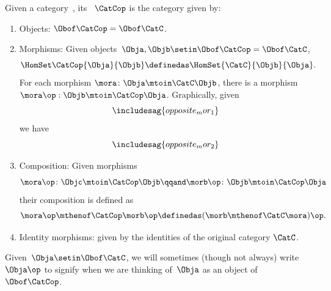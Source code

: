 \begin{ctdefinition}
    \label{def:opposite-category}
    \label{def:oppositecat}
    Given a category~\CatC, its ~$\CatCop$ is the category given by:

    \constit

    \begin{enumerate}
        \item Objects: $\Obof\CatCop = \Obof\CatC$.

        \item Morphisms: Given objects~$\Obja,  \Objb \setin \Obof\CatCop = \Obof\CatC$,
              \begin{equation}\label{eq:homset-op-cat}
                  \HomSet\CatCop{\Obja}{\Objb} \definedas \HomSet{\CatC}{\Objb}{\Obja}.
              \end{equation}
              For each morphism $\mora\colon\Obja\mtoin\CatC\Objb$, there is a morphism
              $\mora\op:\Objb\mtoin\CatCop\Obja$.
              Graphically, given
              \begin{equation}\label{eq:opposite_mor_1}
                  \includesag{opposite_mor_1}
              \end{equation}
              we have
              \begin{equation}
                  \label{eq:opposite_mor_2}
                  \includesag{opposite_mor_2}
              \end{equation}
        \item Composition: Given morphisms
              \begin{equation}
                  \mora\op\colon \Objc \mtoin\CatCop \Objb
                  \qqand
                  \morb\op\colon \Objb \mtoin\CatCop \Obja
              \end{equation}
              their composition is defined as
              \begin{equation}
                  \mora\op \mthenof\CatCop \morb\op \definedas (\morb \mthenof\CatC \mora)\op.
              \end{equation}
        \item Identity morphisms: given by the identities of the original category $\CatC$.
    \end{enumerate}
\end{ctdefinition}
Given~$\Obja \setin \Obof\CatC$, we will sometimes (though not always) write $\Obja\op$ to signify when we are thinking of~$\Obja$ as an object of~$\Obof\CatCop$.

